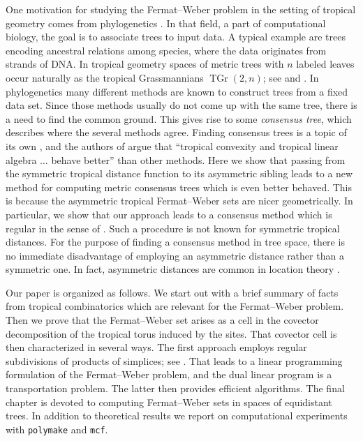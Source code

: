 \documentclass[a4paper,12pt]{amsart}
\DeclareMathOperator\TGr{TGr} %
\theoremstyle{remark}
\newcommand\polymake{\texttt{polymake}\xspace}
\newcommand\mcf{\texttt{mcf}\xspace}
\begin{document}
One motivation for studying the Fermat--Weber problem in the setting of tropical geometry comes from phylogenetics \cite{ConvTreeSp,Lin-Yoshida:2018}.
In that field, a part of computational biology, the goal is to associate trees to input data.
A typical example are trees encoding ancestral relations among species, where the data originates from strands of DNA.
In tropical geometry spaces of metric trees with $n$ labeled leaves occur naturally as the tropical Grassmannians $\TGr(2,n)$; see \cite[]{Tropical+Book} and \cite[]{ETC}.
In phylogenetics many different methods are known to construct trees from a fixed data set.
Since those methods usually do not come up with the same tree, there is a need to find the common ground.
This gives rise to some \emph{consensus tree}, which describes where the several methods agree.
Finding consensus trees is a topic of its own \cite{Bryant:2003}, and the authors of \cite{ConvTreeSp} argue that \enquote{tropical convexity and tropical linear algebra $\ldots$ behave better} than other methods.
Here we show that passing from the symmetric tropical distance function to its asymmetric sibling leads to a new method for computing metric consensus trees which is even better behaved.
This is because the asymmetric tropical Fermat--Weber sets are nicer geometrically.
In particular, we show that our approach leads to a consensus method which is regular in the sense of \cite{Bryant+Francis+Steel:2017}.
Such a procedure is not known for symmetric tropical distances.
For the purpose of finding a consensus method in tree space, there is no immediate disadvantage of employing an asymmetric distance rather than a symmetric one.
In fact, asymmetric distances are common in location theory \cite{NickelPuerto:2005}.

Our paper is organized as follows.
We start out with a brief summary of facts from tropical combinatorics which are relevant for the Fermat--Weber problem.
Then we prove that the Fermat--Weber set arises as a cell in the covector decomposition of the tropical torus induced by the sites.
That covector cell is then characterized in several ways.
The first approach employs regular subdivisions of products of simplices; see \cite[]{DLRS}.
That leads to a linear programming formulation of the Fermat--Weber problem, and the dual linear program is a transportation problem.
The latter then provides efficient algorithms.
The final chapter is devoted to computing Fermat--Weber sets in spaces of equidistant trees.
In addition to theoretical results we report on computational experiments with \polymake \cite{DMV:polymake} and \mcf \cite{mcf}.
\end{document}
